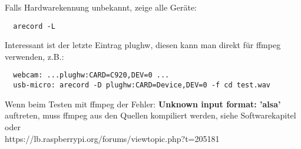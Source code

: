 Falls Hardwarekennung unbekannt, zeige alle Geräte:
\begin{verbatim}
  arecord -L
\end{verbatim}
Interessant ist der letzte Eintrag plughw, diesen kann man direkt für
ffmpeg verwenden, z.B.:
\begin{verbatim}
  webcam: ...plughw:CARD=C920,DEV=0 ...
  usb-micro: arecord -D plughw:CARD=Device,DEV=0 -f cd test.wav
\end{verbatim}

Wenn beim Testen mit ffmpeg der Fehler: 
\textbf{Unknown input format: 'alsa'}\\ 
auftreten, muss ffmpeg aus den Quellen kompiliert werden, siehe 
Softwarekapitel oder\\ 
https://lb.raspberrypi.org/forums/viewtopic.php?t=205181

